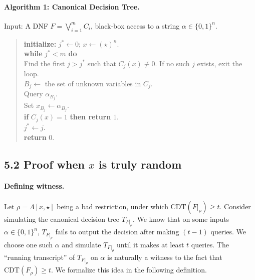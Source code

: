 \paragraph{Algorithm 1: Canonical Decision Tree.}
Input: A DNF $F=\bigvee_{i=1}^mC_i$, black-box access to a string $\alpha\in\{0,1\}^n$.
\begin{quote}\textbf{initialize:} $j^*\leftarrow0$; $x\leftarrow(\star)^n$.\\
\textbf{while} $j^*<m$ \textbf{do}\\
\hspace*{1em}Find the first $j>j^*$ such that $C_j(x)\not\equiv0$. If no such $j$ exists, exit the loop.\\
\hspace*{1em}$B_j\leftarrow$ the set of unknown variables in $C_j$.\\
\hspace*{1em}Query $\alpha_{B_j}$.\\
\hspace*{1em}Set $x_{B_j}\leftarrow\alpha_{B_j}$.\\
\hspace*{1em}\textbf{if} $C_j(x)=1$ \textbf{then return} $1$.\\
\hspace*{1em}$j^*\leftarrow j$.\\
\textbf{return} $0$.\end{quote}
\subsection*{5.2 Proof when $x$ is truly random}
\paragraph{Defining witness.} Let $\rho=\Lambda[x,\star]$ being a bad restriction, under which $\mathrm{CDT}(F|_\rho)\ge t$. Consider simulating the canonical decision tree $T_{F|_\rho}$. We know that on some inputs $\alpha\in\{0,1\}^n$, $T_{F|_\rho}$ fails to output the decision after making $(t-1)$ queries. We choose one such $\alpha$ and simulate $T_{F|_\rho}$ until it makes at least $t$ queries. The ``running transcript'' of $T_{F|_\rho}$ on $\alpha$ is naturally a witness to the fact that $\mathrm{CDT}(F_\rho)\ge t$. We formalize this idea in the following definition.
